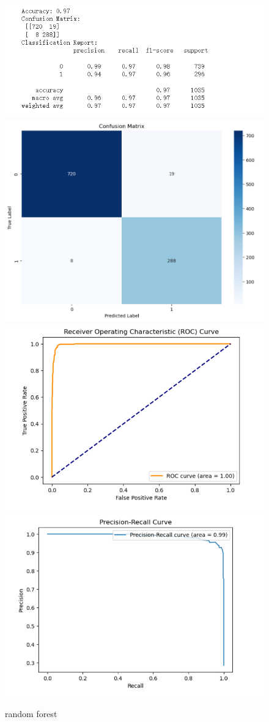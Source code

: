 \documentclass[conference]{IEEEtran}
\begin{document}
\begin{figure}[h]
\centering
    \includegraphics[width=.4\textwidth]{random_forest/rf1.png}
    \includegraphics[width=.4\textwidth]{random_forest/rf2.png}
    \\[\smallskipamount]
    \includegraphics[width=.4\textwidth]{random_forest/rf3.png}
    \includegraphics[width=.4\textwidth]{random_forest/rf4.png}
    \caption{random forest}\label{random_forest}
\end{figure}
\end{document}
